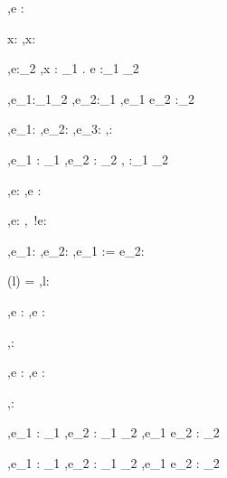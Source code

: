 



  {\Gamma,\Sigma \infers e : \tau}


  {x:\tau\in\Gamma}
  {\Gamma,\Sigma\infers x:\tau}


  {\Gamma[x:\tau_1] ,\Sigma \infers e:\tau_2}
  {\Gamma,\Sigma \infers \lambda x : \tau_1 . e :\tau_1 \to \tau_2}

  {\Gamma,\Sigma \infers e_1:\tau_1\to\tau_2 \Quad
   \Gamma,\Sigma \infers e_2:\tau_1}
  {\Gamma,\Sigma \infers e_1 e_2 :\tau_2}


  {\Gamma,\Sigma \infers e_1:\Bool \Quad
   \Gamma,\Sigma \infers e_2:\tau \Quad
   \Gamma,\Sigma \infers e_3:\tau}
  {\Gamma,\Sigma \infers {}:\tau}


    {\Gamma,\Sigma \infers e_1 : \tau_1  \Quad
     \Gamma,\Sigma \infers e_2 : \tau_2}
    {\Gamma,\Sigma \infers {} :\tau_1 \times \tau_2}


  {\Gamma,\Sigma \infers e:\beta}
  {\Gamma,\Sigma \infers \Ref e :\Reference \beta}

  {\Gamma,\Sigma \infers e:\Reference \beta}
  {\Gamma,\Sigma\infers\ !e:\beta}

  {\Gamma,\Sigma\infers e_1:\Reference \beta \Quad
   \Gamma,\Sigma\infers e_2:\beta}
  {\Gamma,\Sigma\infers e_1 := e_2:\Unit}

  {\Sigma(l) = \beta}
  {\Gamma,\Sigma\infers l:\Reference \beta}


  {\Gamma,\Sigma \infers e : \tau}
  {\Gamma,\Sigma \infers \Edit e : \Task \tau}

  {}
  {\Gamma,\Sigma \infers \Enter \tau : \Task \tau}

  {\Gamma,\Sigma \infers e : \Reference \beta}
  {\Gamma,\Sigma \infers \Update e : \Task \beta}


  {}
  {\Gamma,\Sigma \infers \Fail : \Task \tau}


  {\Gamma,\Sigma \infers e_1 : \Task \tau_1 \Quad
   \Gamma,\Sigma \infers e_2 : \tau_1 \to \Task \tau_2}
  {\Gamma,\Sigma \infers e_1 \Then e_2 : \Task \tau_2}


  {\Gamma,\Sigma \infers e_1 : \Task \tau_1 \Quad
   \Gamma,\Sigma \infers e_2 : \tau_1 \to \Task \tau_2}
  {\Gamma,\Sigma \infers e_1 \Next e_2 : \Task \tau_2}


